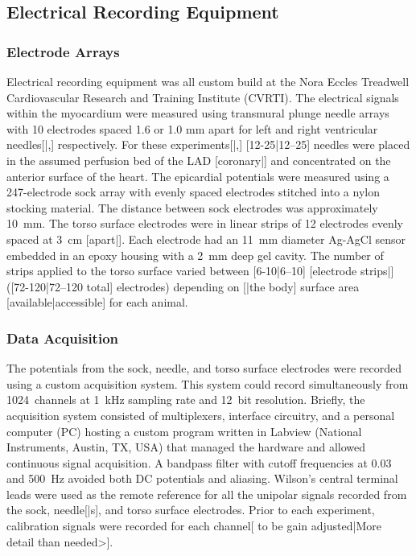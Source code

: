 \documentclass[twocolumn]{cinc}
\begin{document}
\subsection{Electrical Recording Equipment}

\subsubsection{Electrode Arrays}

Electrical recording equipment was all custom build at the Nora Eccles
Treadwell Cardiovascular Research and Training Institute (CVRTI). The
electrical signals within the myocardium were measured using transmural
plunge needle arrays with 10 electrodes spaced 1.6 or 1.0 mm apart for left
and right ventricular needles[|,] respectively. For these experiments[|,]
[12-25|12--25] needles were placed in the assumed perfusion bed of the LAD
[coronary|] and concentrated on the anterior surface of the heart. The
epicardial potentials were measured using a 247-electrode sock array with
evenly spaced electrodes stitched into a nylon stocking material. The
distance between sock electrodes was approximately 10~mm. The torso surface
electrodes were in linear strips of 12 electrodes evenly spaced at 3~cm
[apart|]. Each electrode had an 11~mm diameter Ag-AgCl sensor embedded in
an epoxy housing with a 2~mm deep gel cavity. The number of strips applied
to the torso surface varied between [6-10|6--10] [electrode strips|]
([72-120|72--120 total] electrodes) depending on [|the body] surface area
[available|accessible] for each animal.

\subsubsection{Data Acquisition}

The potentials from the sock, needle, and torso surface electrodes were
recorded using a custom acquisition system. This system could record
simultaneously from 1024~channels at 1~kHz sampling rate and 12~bit
resolution. Briefly, the acquisition system consisted of multiplexers,
interface circuitry, and a personal computer (PC) hosting a custom program
written in Labview (National Instruments, Austin, TX, USA) that managed the
hardware and allowed continuous signal acquisition. A bandpass filter with
cutoff frequencies at 0.03 and 500~Hz avoided both DC potentials and
aliasing.  Wilson's central terminal leads were used as the remote
reference for all the unipolar signals recorded from the sock, needle[|s],
and torso surface electrodes. Prior to each experiment, calibration signals
were recorded for each channel[ to be gain adjusted|More detail than
needed>].
\end{document}
